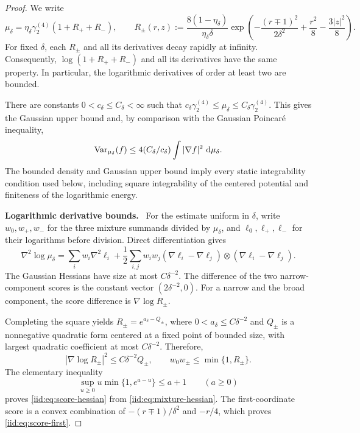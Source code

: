 \documentclass[11pt,reqno]{amsart}
\numberwithin{equation}{section}
\theoremstyle{plain}
\theoremstyle{remark}
\newcommand{\parheading}[1]{\par\medskip\noindent\textbf{#1}\ }
\begin{document}
\begin{proof}
We write
\begin{equation}\label{iid:eq:profile-ratios}
 \mu_\delta=\eta_\delta\gamma_2^{(4)}(1+R_++R_-),\qquad
 R_\pm(r,z):=\frac{8(1-\eta_\delta)}{\eta_\delta\delta}
 \exp\left(-\frac{(r\mp1)^2}{2\delta^2}+\frac{r^2}{8}
 -\frac{3|z|^2}{8}\right).
\end{equation}
For fixed $\delta$, each $R_\pm$ and all its derivatives decay rapidly at infinity. Consequently, $\log(1+R_++R_-)$ and all its derivatives have the same property. In particular, the logarithmic derivatives of order at least two are bounded.

There are constants $0<c_\delta\le C_\delta<\infty$ such that $c_\delta\gamma_2^{(4)}\le\mu_\delta\le C_\delta\gamma_2^{(4)}$. This gives the Gaussian upper bound and, by comparison with the Gaussian Poincar\'e inequality,
\begin{equation}\label{iid:eq:poincare}
 \operatorname{Var}_{\mu_\delta}(f)\le 4(C_\delta/c_\delta)
 \int|\nabla f|^2\,\,\mathrm d\mu_\delta.
\end{equation}
The bounded density and Gaussian upper bound imply every static integrability condition used below, including square integrability of the centered potential and finiteness of the logarithmic energy.

\parheading{Logarithmic derivative bounds.}
For the estimate uniform in $\delta$, write $w_0,w_+,w_-$ for the three mixture summands divided by $\mu_\delta$, and $\ell_0,\ell_+,\ell_-$ for their logarithms before division. Direct differentiation gives
\begin{equation}\label{iid:eq:mixture-hessian}
 \nabla^2\log\mu_\delta
 =\sum_iw_i\nabla^2\ell_i
 +\frac12\sum_{i,j}w_iw_j
 (\nabla\ell_i-\nabla\ell_j)\otimes
 (\nabla\ell_i-\nabla\ell_j).
\end{equation}
The Gaussian Hessians have size at most $C\delta^{-2}$. The difference of the two narrow-component scores is the constant vector $(2\delta^{-2},0)$. For a narrow and the broad component, the score difference is $\nabla\log R_\pm$.

Completing the square yields $R_\pm=e^{a_\delta-Q_\pm}$, where $0<a_\delta\le C\delta^{-2}$ and $Q_\pm$ is a nonnegative quadratic form centered at a fixed point of bounded size, with largest quadratic coefficient at most $C\delta^{-2}$. Therefore,
\begin{equation}\label{iid:eq:score-ratio-bound}
 |\nabla\log R_\pm|^2\le C\delta^{-2}Q_\pm,
 \qquad
 w_0w_\pm\le\min\{1,R_\pm\}.
\end{equation}
The elementary inequality
\begin{equation}\label{iid:eq:quadratic-mixture-bound}
 \sup_{u\ge0}u\min\{1,e^{a-u}\}\le a+1\qquad(a\ge0)
\end{equation}
proves \eqref{iid:eq:score-hessian} from \eqref{iid:eq:mixture-hessian}. The first-coordinate score is a convex combination of $-(r\mp1)/\delta^2$ and $-r/4$, which proves \eqref{iid:eq:score-first}.


\end{proof}
\end{document}
